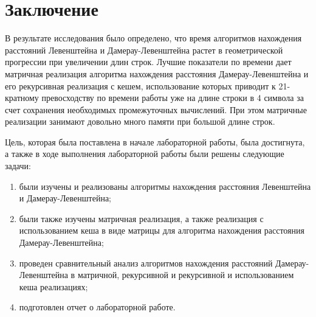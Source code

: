 \chapter*{Заключение}

В результате исследования было определено, что время алгоритмов нахождения расстояний Левенштейна и Дамерау-Левенштейна растет в геометрической прогрессии при увеличении длин строк. Лучшие показатели по времени дает матричная реализация алгоритма нахождения расстояния Дамерау-Левенштейна и его рекурсивная реализация с кешем, использование которых приводит к 21-кратному превосходству по времени работы уже на длине строки в 4 символа за счет сохранения необходимых промежуточных вычислений. При этом матричные реализации занимают довольно много памяти при большой длине строк. 


Цель, которая была поставлена в начале лабораторной работы, была достигнута, а также в ходе выполнения лабораторной работы были решены следующие задачи:

\begin{enumerate}[label=\arabic*)]
	\item были изучены и реализованы алгоритмы нахождения расстояния Левенштейна и Дамерау-Левенштейна;
	\item были также изучены матричная реализация, а также реализация с использованием кеша в виде матрицы для алгоритма нахождения расстояния Дамерау-Левенштейна;
    \item проведен сравнительный анализ алгоритмов нахождения расстояний Дамерау-Левенштейна в матричной, рекурсивной и рекурсивной и использованием кеша реализациях;
	\item подготовлен отчет о лабораторной работе.
\end{enumerate}